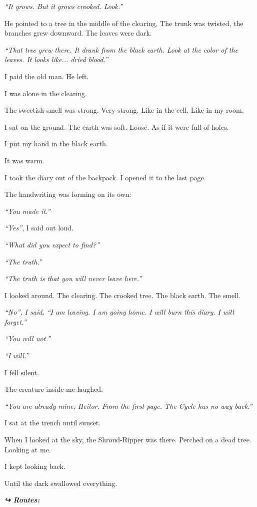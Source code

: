 \noindent \textit{\textquotedblleft{}It grows. But it grows crooked. Look.\textquotedblright{}}

\noindent He pointed to a tree in the middle of the clearing. The trunk was twisted, the branches grew downward. The leaves were dark.

\noindent \textit{\textquotedblleft{}That tree grew there. It drank from the black earth. Look at the color of the leaves. It looks like... dried blood.\textquotedblright{}}

\noindent I paid the old man. He left.

\noindent I was alone in the clearing.

\noindent The sweetish smell was strong. Very strong. Like in the cell. Like in my room.

\noindent I sat on the ground. The earth was soft. Loose. As if it were full of holes.

\noindent I put my hand in the black earth.

\noindent It was warm.

\noindent I took the diary out of the backpack. I opened it to the last page.

\noindent The handwriting was forming on its own:

\noindent \textit{\textquotedblleft{}You made it.\textquotedblright{}}

\noindent \textit{\textquotedblleft{}Yes\textquotedblright{}}, I said out loud.

\noindent \textit{\textquotedblleft{}What did you expect to find?\textquotedblright{}}

\noindent \textit{\textquotedblleft{}The truth.\textquotedblright{}}

\noindent \textit{\textquotedblleft{}The truth is that you will never leave here.\textquotedblright{}}

\noindent I looked around. The clearing. The crooked tree. The black earth. The smell.

\noindent \textit{\textquotedblleft{}No\textquotedblright{}\textit{, I said. }\textquotedblleft{}I am leaving. I am going home. I will burn this diary. I will forget.\textquotedblright{}}

\noindent \textit{\textquotedblleft{}You will not.\textquotedblright{}}

\noindent \textit{\textquotedblleft{}I will.\textquotedblright{}}

\noindent I fell silent.

\noindent The creature inside me laughed.

\noindent \textit{\textquotedblleft{}You are already mine, Heitor. From the first page. The Cycle has no way back.\textquotedblright{}}

\noindent I sat at the trench until sunset.

\noindent When I looked at the sky, the Shroud-Ripper was there. Perched on a dead tree. Looking at me.

\noindent I kept looking back.

\noindent Until the dark swallowed everything.

\vspace{0.5em}
\noindent\textit{\textbf{↪ Routes:}  \rotasep {}}
